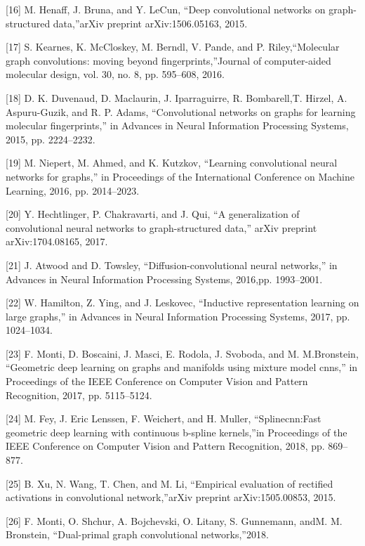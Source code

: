 \documentclass{article}
\begin{document}
[16]  M. Henaff, J. Bruna, and Y. LeCun, “Deep convolutional networks on graph-structured data,”arXiv preprint arXiv:1506.05163, 2015.

[17]  S.  Kearnes,  K.  McCloskey,  M.  Berndl,  V.  Pande,  and  P.  Riley,“Molecular  graph  convolutions:  moving  beyond  fingerprints,”Journal  of  computer-aided  molecular  design,  vol.  30,  no.  8,  pp.  595–608, 2016.

[18]  D.  K.  Duvenaud,  D.  Maclaurin,  J.  Iparraguirre,  R.  Bombarell,T. Hirzel, A. Aspuru-Guzik, and R. P. Adams, “Convolutional networks on graphs for learning molecular fingerprints,” in Advances in Neural Information Processing Systems, 2015, pp. 2224–2232.

[19]  M. Niepert, M. Ahmed, and K. Kutzkov, “Learning convolutional neural  networks  for  graphs,”  in Proceedings  of  the  International Conference on Machine Learning, 2016, pp. 2014–2023.

[20]  Y.  Hechtlinger,  P.  Chakravarti,  and  J.  Qui,  “A  generalization  of convolutional  neural networks  to  graph-structured  data,”  arXiv preprint arXiv:1704.08165, 2017.

[21]  J.  Atwood  and  D.  Towsley,  “Diffusion-convolutional  neural  networks,” in Advances in Neural Information Processing Systems, 2016,pp. 1993–2001.

[22]  W. Hamilton, Z. Ying, and J. Leskovec, “Inductive representation learning  on  large  graphs,”  in Advances  in  Neural  Information  Processing Systems, 2017, pp. 1024–1034.

[23]  F. Monti, D. Boscaini, J. Masci, E. Rodola, J. Svoboda, and M. M.Bronstein,  “Geometric  deep  learning  on  graphs  and  manifolds using  mixture  model  cnns,”  in Proceedings  of  the  IEEE  Conference on Computer Vision and Pattern Recognition, 2017, pp. 5115–5124.

[24]  M.  Fey,  J.  Eric  Lenssen,  F.  Weichert,  and  H.  Muller,  “Splinecnn:Fast  geometric  deep  learning  with  continuous  b-spline  kernels,”in Proceedings of the IEEE Conference on Computer Vision and Pattern Recognition, 2018, pp. 869–877.

[25]  B.  Xu,  N.  Wang,  T.  Chen,  and  M.  Li,  “Empirical  evaluation of  rectified  activations  in  convolutional  network,”arXiv  preprint arXiv:1505.00853, 2015.

[26]  F. Monti, O. Shchur, A. Bojchevski, O. Litany, S. Gunnemann, andM.  M.  Bronstein,  “Dual-primal  graph  convolutional  networks,”2018.
\end{document}
